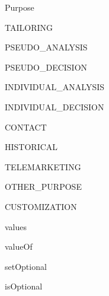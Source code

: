 \begin{jdclass}[class]{Purpose}
\begin{jdfield}{TAILORING}
\end{jdfield}
\begin{jdfield}{PSEUDO\_ANALYSIS}
\jdpublic \jdfinal \jdstatic 
{}
\end{jdfield}
\begin{jdfield}{PSEUDO\_DECISION}
\jdpublic \jdfinal \jdstatic 
{}
\end{jdfield}
\begin{jdfield}{INDIVIDUAL\_ANALYSIS}
\jdpublic \jdfinal \jdstatic 
{}
\end{jdfield}
\begin{jdfield}{INDIVIDUAL\_DECISION}
\jdpublic \jdfinal \jdstatic 
{}
\end{jdfield}
\begin{jdfield}{CONTACT}
\jdpublic \jdfinal \jdstatic 
{}
\end{jdfield}
\begin{jdfield}{HISTORICAL}
\jdpublic \jdfinal \jdstatic 
{}
\end{jdfield}
\begin{jdfield}{TELEMARKETING}
\jdpublic \jdfinal \jdstatic 
{}
\end{jdfield}
\begin{jdfield}{OTHER\_PURPOSE}
\jdpublic \jdfinal \jdstatic 
{}
\end{jdfield}
\begin{jdfield}{CUSTOMIZATION}
\jdpublic \jdfinal \jdstatic 
{}
\end{jdfield}
\begin{jdmethod}{values}
\jdpublic \jdstatic 
{}
\end{jdmethod}
\begin{jdmethod}{valueOf}
\jdpublic \jdstatic 
{}
\end{jdmethod}
\begin{jdmethod}{setOptional}
\jdpublic 
{}
\end{jdmethod}
\begin{jdmethod}{isOptional}
\jdpublic 
{}
\end{jdmethod}
\end{jdclass}

